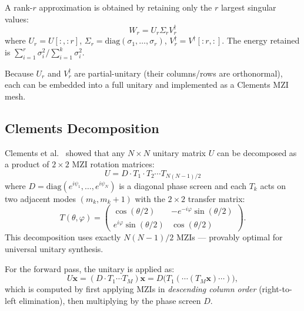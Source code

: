 \documentclass[12pt, a4paper]{article}
\begin{document}
A rank-$r$ approximation is obtained by retaining only the $r$ largest singular
values:
\begin{equation}
  W_r = U_r \Sigma_r V_r^\dagger
  \label{eq:svd_truncated}
\end{equation}
where $U_r = U[:, :r]$, $\Sigma_r = \text{diag}(\sigma_1, \ldots, \sigma_r)$,
$V_r^\dagger = V^\dagger[:r, :]$.
The energy retained is $\sum_{i=1}^r \sigma_i^2 / \sum_{i=1}^k \sigma_i^2$.

Because $U_r$ and $V_r^\dagger$ are partial-unitary (their columns/rows are
orthonormal), each can be embedded into a full unitary and implemented as a
Clements MZI mesh.

\subsection{Clements Decomposition}
\label{sec:clements_background}

Clements et al.~\cite{clements2016} showed that any $N \times N$ unitary matrix
$U$ can be decomposed as a product of $2 \times 2$ MZI rotation matrices:
\begin{equation}
  U = D \cdot T_1 \cdot T_2 \cdots T_{N(N-1)/2}
  \label{eq:clements}
\end{equation}
where $D = \text{diag}(e^{i\psi_1}, \ldots, e^{i\psi_N})$ is a diagonal phase
screen and each $T_k$ acts on two adjacent modes $(m_k, m_k{+}1)$ with the
$2\times2$ transfer matrix:
\begin{equation}
  T(\theta, \varphi) =
  \begin{pmatrix}
    \cos(\theta/2) & -e^{-i\varphi}\sin(\theta/2) \\
    e^{i\varphi}\sin(\theta/2) & \cos(\theta/2)
  \end{pmatrix}.
  \label{eq:mzi_matrix}
\end{equation}
This decomposition uses exactly $N(N-1)/2$ MZIs --- provably optimal for
universal unitary synthesis.

For the forward pass, the unitary is applied as:
\begin{equation}
  U \mathbf{x} = (D \cdot T_1 \cdots T_M) \mathbf{x}
  = D \bigl( T_1 ( \cdots (T_M \mathbf{x}) \cdots ) \bigr),
  \label{eq:clements_forward}
\end{equation}
which is computed by first applying MZIs in \emph{descending column order}
(right-to-left elimination), then multiplying by the phase screen $D$.

\end{document}
